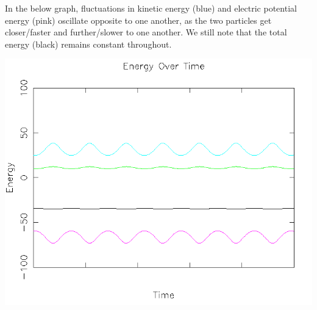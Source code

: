 \documentclass{article}
\begin{document}
In the below graph, fluctuations in kinetic energy (blue) and electric potential energy (pink) oscillate opposite to one another,
as the two particles get closer/faster and further/slower to one another.
We still note that the total energy (black) remains constant throughout.
\\
\begin{center}
    \includegraphics[scale=0.5]{orbit_energy}
\end{center}
\end{document}
